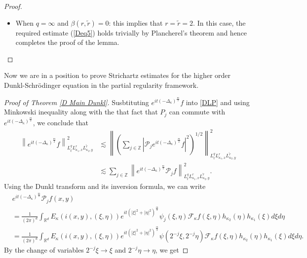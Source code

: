 \documentclass[a4paper,11pt, reqno]{amsart}
\theoremstyle{definition}
\theoremstyle{remark}
\numberwithin{equation}{section}
\begin{document}
\begin{proof}
\begin{itemize}
$$\begin{aligned}
				& \lesssim\|g\|_{L_t^{q^{\prime}} L_{\kappa_1, x}^{\tau_x^{\prime}} L_{\kappa_2, y}^{\tilde{r}^{\prime}}}.
			\end{aligned}
			$$
			\item 	When  $q=\infty$ and $ \beta(r, \widetilde{r})=0$: this implies  that  $r=\widetilde{r}=2$. In this case, the required estimate (\ref{Deq5})   holds trivially by Plancherel's theorem and hence completes the proof of the lemma.
		\end{itemize}
	\end{proof} 
	Now we are in a position to prove  Strichartz estimates for the higher order Dunkl-Schr\"odinger equation in the partial regularity framework.
	
	\begin{proof}[Proof of  Theorem \ref{D Main Dunkl}]
		Susbtituting $e^{i t(-\Delta_\kappa)^{\frac{m}{2}}} f$  into \eqref{DLP} and  using   Minkowski inequality along with  the that fact that $P_j$ can commute with $e^{i t(-\Delta_\kappa)^{\frac{m}{2}}}$,  we conclude that 
		\begin{align}\label{Deq12}\nonumber
			\left\|e^{i t(-\Delta_\kappa)^{\frac{m}{2}}} f\right\|_{L_t^q L_{\kappa_1, x}^r L_{\kappa_2, y}^{\tilde{r}}}^2 &\lesssim\left\| \left( \sum_{j \in \mathbb{Z}} \left|\mathcal{P}_j e^{i t(-\Delta_\kappa)^{\frac{m}{2}}} f\right|^2\right)^{1 / 2}\right\|_{L_t^q L_{\kappa_1, x}^r L_{\kappa_2, y}^{\tilde{r}}}^2 \\
			& \lesssim \sum_{j \in \mathbb{Z}}\left\|e^{i t(-\Delta_\kappa)^{\frac{m}{2}}} \mathcal{P}_j f\right\|_{L_t^q L_{\kappa_1, x}^r L_{\kappa_2, y}^{\tilde{r}}}^2.
		\end{align}
		Using the Dunkl transform and its  inversion formula, we can write 
		$$
		\begin{aligned}
			&e^{i t(-\Delta_\kappa)^{\frac{m}{2}}} \mathcal{P}_j  f(x, y) \\& =\frac{1}{(2 \pi)^d} \int_{\mathbb{R}^{d}}      E_{\kappa}(i(x, y),(\xi, \eta) ) e^{it  (|\xi|^2+|\eta|^2)^{\frac{m}{2}}} \psi_j(\xi, \eta) \mathcal{F}_\kappa{f} ( \xi,  \eta )   h_{\kappa_2}(\eta )   h_{\kappa_1}(\xi) d \xi  d \eta\\
			&=\frac{1}{(2 \pi)^d}  \int_{\mathbb{R}^{d}}      E_{\kappa}(i(x, y),(\xi, \eta) ) e^{it  (|\xi|^2+|\eta|^2)^{\frac{m}{2}}}   \psi(2^{-j}\xi, 2^{-j}\eta) \mathcal{F}_\kappa{f} ( \xi,  \eta )   h_{\kappa_2}(\eta )   h_{\kappa_1}(\xi) d \xi  d \eta.
		\end{aligned}
		$$
		By the  change of variables $2^{-j} \xi \rightarrow \xi$ and $2^{-j} \eta \rightarrow \eta$,  we get 

\end{proof}
\end{document}

